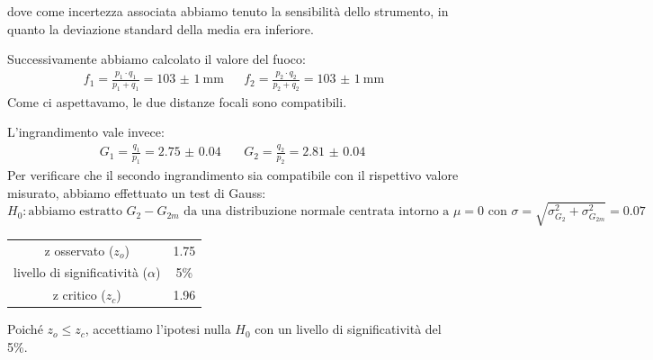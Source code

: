\documentclass[a4paper]{article}
\begin{document}
    dove come incertezza associata abbiamo tenuto la sensibilità dello strumento, in quanto la deviazione standard della media era inferiore.
    
    Successivamente abbiamo calcolato il valore del fuoco:
    \begin{align*}
    	f_1=\frac{p_1\cdot q_1}{p_1+q_1}=\SI{103(1)}{\mm} && f_2=\frac{p_2\cdot q_2}{p_2+q_2}=\SI{103(1)}{\mm}
    \end{align*}
    Come ci aspettavamo, le due distanze focali sono compatibili.
    
    L'ingrandimento vale invece:
    \begin{align*}
    	G_1=\frac{q_1}{p_1}=\SI{2.75(4)}{} && G_2=\frac{q_2}{p_2}=\SI{2.81(4)}{}
    \end{align*}
    Per verificare che il secondo ingrandimento sia compatibile con il rispettivo valore misurato, abbiamo effettuato un test di Gauss:
    \[
    H_0: \text{abbiamo estratto $G_2-G_{2m}$ da una distribuzione normale centrata intorno a $\mu=0$ con $\sigma=\sqrt{\sigma_{G_2}^2+\sigma_{G_{2m}}^2}=0.07$}
    \]
    \begin{table}[H]
    	\centering
    	\begin{tabular}{|c|c|}
    		\hline
    		z osservato ($z_o$) & 1.75 \\
    		livello di significatività ($\alpha$) & 5\% \\
    		z critico ($z_c$) & 1.96 \\ \hline
    	\end{tabular}
    	\label{tab:gauss-ingrandimento}
    \end{table}
    Poiché $z_o\leq z_c$, accettiamo l'ipotesi nulla $H_0$ con un livello di significatività del 5\%.
\end{document}
